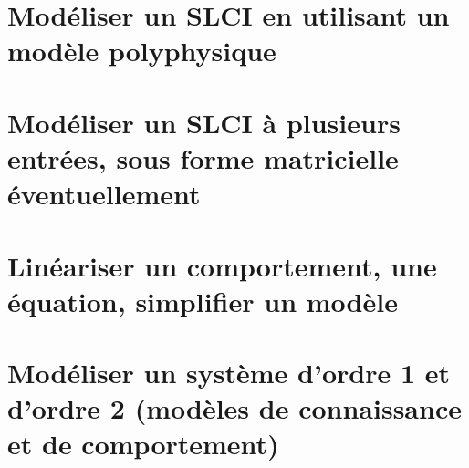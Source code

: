\graphicspath{{\repStyle/png/}{../SLCI/SLCI-03-SchemaBlocs/71_Robovolc/images/}} 
 
 
\graphicspath{{\repStyle/png/}{../SLCI/SLCI-03-SchemaBlocs/77_ProtheseTibia/images/}} 
 
 
\graphicspath{{\repStyle/png/}{../SLCI/SLCI-03-SchemaBlocs/78_RobotDaVinci/images/}} 
 
 
\graphicspath{{\repStyle/png/}{../SLCI/SLCI-03-SchemaBlocs/79_Tuyere/images/}} 
 
 
\graphicspath{{\repStyle/png/}{../SLCI/SLCI-03-SchemaBlocs/80_Clever/images/}} 
 
 
\section{Modéliser un SLCI en utilisant un modèle polyphysique} 
\section{Modéliser un SLCI à plusieurs entrées, sous forme matricielle éventuellement} 
\section{Linéariser un comportement, une équation, simplifier un modèle} 
\section{Modéliser un système d'ordre 1 et d'ordre 2  (modèles de connaissance et de comportement)} 
\graphicspath{{\repStyle/png/}{../SLCI/SLCI-07-Ordre12/502_Divers/images/}} 
 
 
\graphicspath{{\repStyle/png/}{../SLCI/SLCI-07-Ordre12/503_Divers/images/}} 
 
 
\graphicspath{{\repStyle/png/}{../SLCI/SLCI-07-Ordre12/504_Divers/images/}} 
 
 
\graphicspath{{\repStyle/png/}{../SLCI/SLCI-07-Ordre12/506_Divers/images/}} 
 
 
